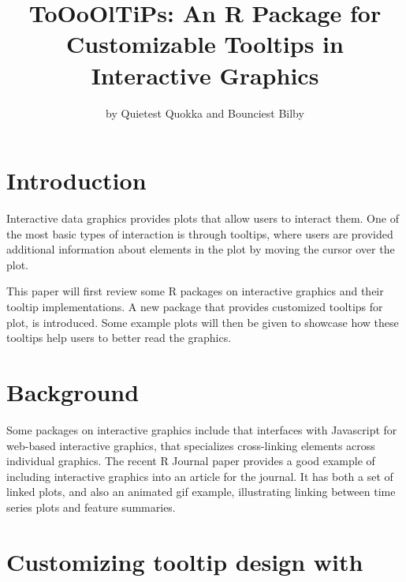 \title{ToOoOlTiPs: An R Package for Customizable Tooltips in Interactive
Graphics}
\author{by Quietest Quokka and Bounciest Bilby}

\maketitle


\hypertarget{introduction}{%
\section{Introduction}\label{introduction}}

Interactive data graphics provides plots that allow users to interact
them. One of the most basic types of interaction is through tooltips,
where users are provided additional information about elements in the
plot by moving the cursor over the plot.

This paper will first review some R packages on interactive graphics and
their tooltip implementations. A new package  that
provides customized tooltips for plot, is introduced. Some example plots
will then be given to showcase how these tooltips help users to better
read the graphics.

\hypertarget{background}{%
\section{Background}\label{background}}

Some packages on interactive graphics include 
\citep{plotly} that interfaces with Javascript for web-based interactive
graphics,  \citep{crosstalk} that specializes
cross-linking elements across individual graphics. The recent R Journal
paper  \citep{RJ-2021-050} provides a good example
of including interactive graphics into an article for the journal. It
has both a set of linked plots, and also an animated gif example,
illustrating linking between time series plots and feature summaries.

\hypertarget{customizing-tooltip-design-with}{%
\section{\texorpdfstring{Customizing tooltip design with
}{Customizing tooltip design with }}\label{customizing-tooltip-design-with}}

